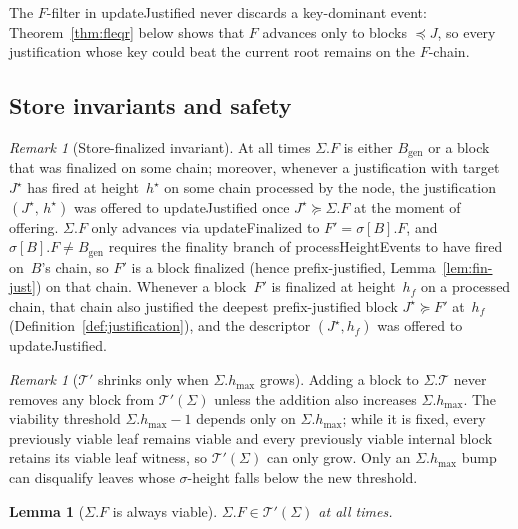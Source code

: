 \ifx\litemode\undefined\documentclass{article}\fi
\newcommand{\genesis}{\ensuremath{B_{\mathrm{gen}}}}
\newcommand{\T}[0]{\ensuremath{\mathcal{T}}}
\newcommand{\hmax}{\ensuremath{h_{\max}}\xspace}
\newcommand{\viableTree}{\ensuremath{\mathcal{T}'}}
\newcommand{\processHeightEvents}{\textsf{processHeightEvents}\xspace}
\newcommand{\updateJustified}{\textsf{updateJustified}\xspace}
\newcommand{\updateFinalized}{\textsf{updateFinalized}\xspace}
\theoremstyle{plain}
\newtheorem{lemma}{Lemma}
\theoremstyle{definition}
\theoremstyle{remark}
\newtheorem{remark}[theorem]{Remark}
\begin{document}
The $F$-filter in \updateJustified never discards a key-dominant event: Theorem~\ref{thm:fleqr} below shows that $F$ advances only to blocks $\preceq J$, so every justification whose key could beat the current root remains on the $F$-chain.

\subsection{Store invariants and safety}

\begin{remark}[Store-finalized invariant]\label{rem:fs-invariant}
At all times $\Sigma.F$ is either $\genesis$ or a block that was finalized on some chain; moreover, whenever a justification with target~$J^\star$ has fired at height~$h^\star$ on some chain processed by the node, the justification $(J^\star,\, h^\star)$ was offered to \updateJustified once $J^\star \succeq \Sigma.F$ at the moment of offering.
$\Sigma.F$ only advances via \updateFinalized to $F' = \sigma[B].F$, and $\sigma[B].F \neq \genesis$ requires the finality branch of \processHeightEvents to have fired on~$B$'s chain, so $F'$ is a block finalized (hence prefix-justified, Lemma~\ref{lem:fin-just}) on that chain.
Whenever a block~$F'$ is finalized at height~$h_f$ on a processed chain, that chain also justified the deepest prefix-justified block $J^\star \succeq F'$ at~$h_f$ (Definition~\ref{def:justification}), and the descriptor $(J^\star, h_f)$ was offered to \updateJustified.
\end{remark}

\begin{remark}[$\viableTree$ shrinks only when $\Sigma.\hmax$ grows]\label{rem:viable-monotone}
Adding a block to $\Sigma.\T$ never removes any block from $\viableTree(\Sigma)$ unless the addition also increases $\Sigma.\hmax$.
The viability threshold $\Sigma.\hmax - 1$ depends only on $\Sigma.\hmax$; while it is fixed, every previously viable leaf remains viable and every previously viable internal block retains its viable leaf witness, so $\viableTree(\Sigma)$ can only grow.
Only an $\Sigma.\hmax$ bump can disqualify leaves whose $\sigma$-height falls below the new threshold.
\end{remark}

\begin{lemma}[$\Sigma.F$ is always viable]\label{lem:F-viable}
$\Sigma.F \in \viableTree(\Sigma)$ at all times.
\end{lemma}
\end{document}
